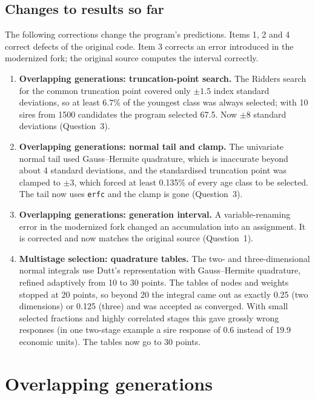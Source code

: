 \documentclass[11pt]{article}
\newcommand{\src}[1]{\texttt{#1}}
\begin{document}
\subsection{Changes to results so far}
The following corrections change the program's predictions. Items 1, 2 and 4 correct defects of the original code. Item 3 corrects an error introduced in the modernized fork; the original source computes the interval correctly.
\begin{enumerate}
\item \textbf{Overlapping generations: truncation-point search.} The Ridders search for the common truncation point covered only $\pm1.5$ index standard deviations, so at least 6.7\% of the youngest class was always selected; with 10 sires from 1500 candidates the program selected 67.5. Now $\pm8$ standard deviations (Question~3).
\item \textbf{Overlapping generations: normal tail and clamp.} The univariate normal tail used Gauss--Hermite quadrature, which is inaccurate beyond about 4 standard deviations, and the standardised truncation point was clamped to $\pm3$, which forced at least 0.135\% of every age class to be selected. The tail now uses \src{erfc} and the clamp is gone (Question~3).
\item \textbf{Overlapping generations: generation interval.} A variable-renaming error in the modernized fork changed an accumulation into an assignment. It is corrected and now matches the original source (Question~1).
\item \textbf{Multistage selection: quadrature tables.} The two- and three-dimensional normal integrals use Dutt's representation \cite{dutt1973} with Gauss--Hermite quadrature, refined adaptively from 10 to 30 points. The tables of nodes and weights stopped at 20 points, so beyond 20 the integral came out as exactly 0.25 (two dimensions) or 0.125 (three) and was accepted as converged. With small selected fractions and highly correlated stages this gave grossly wrong responses (in one two-stage example a sire response of 0.6 instead of 19.9 economic units). The tables now go to 30 points.
\end{enumerate}

\section{Overlapping generations}\label{sec:ovlp}
\end{document}
